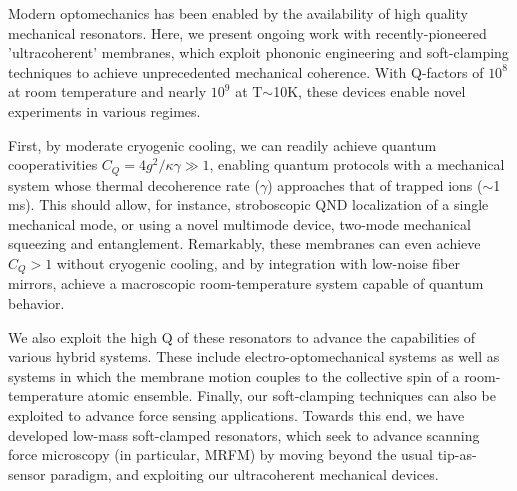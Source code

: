 Modern optomechanics has been enabled by the availability of high quality mechanical resonators.  Here, we present ongoing work with recently-pioneered \cite{Tsaturyan_2017} 'ultracoherent' membranes, which exploit phononic engineering and soft-clamping techniques to achieve unprecedented mechanical coherence.  With Q-factors of $10^8$ at room temperature and nearly $10^9$ at T$\sim$10K, these devices enable novel experiments in various regimes.

First, by moderate cryogenic cooling, we can readily achieve quantum cooperativities $C_Q = 4g^2/\kappa\gamma \gg 1$, enabling quantum protocols with a mechanical system whose thermal decoherence rate ($\gamma$) approaches that of trapped ions ($\sim$1 ms).  This should allow, for instance, stroboscopic QND localization of a single mechanical mode, or using a novel multimode device, two-mode mechanical squeezing and entanglement.  Remarkably, these membranes can even achieve $C_Q>1$ without cryogenic cooling, and by integration with low-noise fiber mirrors, achieve a macroscopic room-temperature system capable of quantum behavior.

We also exploit the high Q of these resonators to advance the capabilities of various hybrid systems.  These include electro-optomechanical systems\cite{Bagci_2014} as well as systems in which the membrane motion couples to the collective spin of a room-temperature atomic ensemble\cite{M_ller_2017}.  Finally, our soft-clamping techniques can also be exploited to advance force sensing applications.  Towards this end, we have developed low-mass soft-clamped resonators, which seek to advance scanning force microscopy (in particular, MRFM) by moving beyond the usual tip-as-sensor paradigm, and exploiting our ultracoherent mechanical devices.